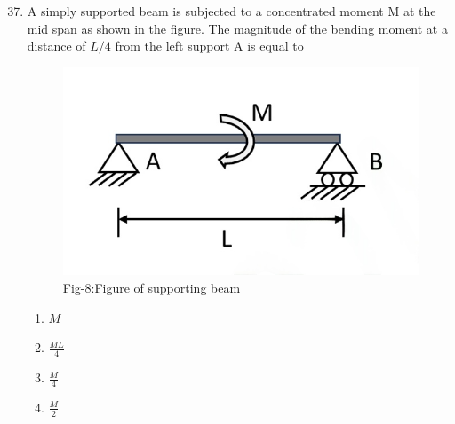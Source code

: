 \documentclass[journal]{IEEEtran}
\theoremstyle{remark}
\begin{document}
\begin{enumerate}[itemsep=1em]
\setcounter{enumi}{36}
\item A simply supported beam is subjected to a concentrated moment M at the mid span as shown in the figure. The magnitude of the bending moment at a distance of $L/4$ from the left support A is equal to
\begin{figure}[H]
    \centering
    \includegraphics[width=0.5\columnwidth]{figs/fig-8.jpg}
    \caption*{Fig-8:Figure of supporting beam}
    \label{fig-8}
\end{figure}
\begin{multicols}{4}
\begin{enumerate}
       \item $M$
       \item $\frac{ML}{4}$
       \item $\frac{M}{4}$  
       \item $\frac{M}{2}$ 
\end{enumerate}
\end{multicols}

\end{enumerate}

\newpage
\vspace*{0.25cm}
\end{document}
